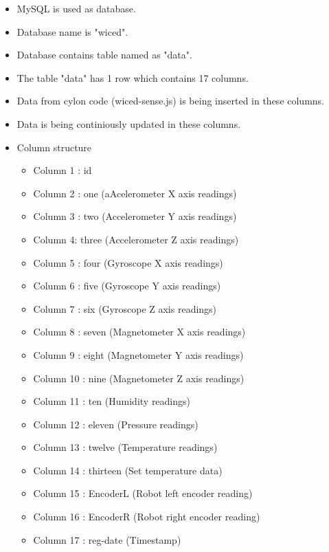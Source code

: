 \documentclass[a4paper,12pt,oneside]{book}
\begin{document}
\begin{itemize}
\item MySQL is used as database.
\item Database name is "wiced".
\item Database contains table named as "data".
\item The table "data" has 1 row which contains 17 columns.
\item Data from cylon code (wiced-sense.js) is being inserted in these columns.
\item Data is being continiously updated in these columns.
\item Column structure 
\begin{itemize}
    \item Column 1 : id 
    \item Column 2 : one (aAcelerometer X axis readings)
\item Column 3 : two (Accelerometer Y axis readings)
\item Column 4: three (Accelerometer Z axis readings)
\item Column 5 : four (Gyroscope X axis readings)
\item Column 6 : five (Gyroscope Y axis readings)
\item Column 7 : six  (Gyroscope Z axis readings)
\item Column 8 : seven (Magnetometer X axis readings)
\item Column 9 : eight (Magnetometer Y axis readings)
\item Column 10 : nine (Magnetometer Z axis readings)
\item Column 11 : ten (Humidity readings)
\item Column 12 : eleven (Pressure readings)
\item Column 13 : twelve (Temperature readings)
\item Column 14 : thirteen (Set temperature data)
\item Column 15 : EncoderL (Robot left encoder reading)
\item Column 16 : EncoderR (Robot right encoder reading)
\item Column 17 : reg-date (Timestamp)

\end{itemize}















\end{itemize}
\end{document}
